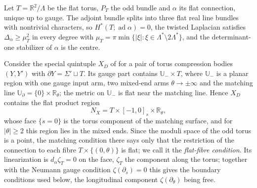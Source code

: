 \documentclass[11pt]{amsart}
\theoremstyle{definition}
\theoremstyle{remark}
\theoremstyle{plain}
\numberwithin{equation}{section}
\newcommand{\RR}{\mathbb{R}}
\newcommand{\ad}{\operatorname{ad}}
\begin{document}
Let $T=\RR^2/\Lambda$ be the flat torus, $P_T$ the odd bundle and $\alpha$ its
flat connection, unique up to gauge. The adjoint bundle splits into three flat
real line bundles with nontrivial characters, so $H^*(T;\ad\alpha)=0$, the
twisted Laplacian satisfies $\Delta_\alpha\ge\mu_T^2$ in every degree with
$\mu_T=\pi\min\{|\xi|:\xi\in\Lambda^*\setminus2\Lambda^*\}$, and the
determinant-one stabilizer of $\alpha$ is the centre.

Consider the special quintuple $X_D$ of \cite[Section~3.1]{DFL} for a pair of
torus compression bodies $(Y,Y')$ with $\partial Y=\Sigma'\sqcup T$. Its gauge
part contains $\mathbb U_-\times T$, where $\mathbb U_-$ is a planar region with one gauge
input arm, two mixed-end arms $\theta\to\pm\infty$ and the matching line
$\mathbb U_\partial=\{0\}\times\RR_\theta$; the metric on $\mathbb U_-$ is flat near the matching
line. Hence $X_D$ contains the flat product region
\[
N_X=T\times[-1,0]_s\times\RR_\theta ,
\]
whose face $\{s=0\}$ is the torus component of the matching surface, and for
$|\theta|\ge2$ this region lies in the mixed ends. Since the moduli space of the
odd torus is a point, the matching condition there says only that the
restriction of the connection to each fibre $T\times\{(0,\theta)\}$ is flat; we
call it the \emph{flat-fibre condition}. Its linearization is $d_\alpha\zeta_T=0$
on the face, $\zeta_T$ the component along the torus; together with the Neumann
gauge condition $\zeta(\partial_s)=0$ this gives the boundary conditions used below,
the longitudinal component $\zeta(\partial_\theta)$ being free.
\end{document}

